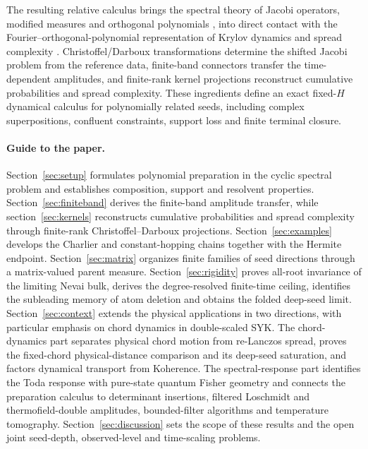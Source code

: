 \documentclass[a4paper,11pt]{article}
\theoremstyle{definition}
\theoremstyle{remark}
\begin{document}
The resulting relative calculus brings the spectral theory of Jacobi operators,
modified measures and orthogonal polynomials
\cite{Chihara1978,Szego1975,SimonOPRL1,Uvarov1969,KautskyGolub1983},
into direct contact with the Fourier--orthogonal-polynomial representation of
Krylov dynamics and spread complexity
\cite{Balasubramanian:2022tpr,MuckYang:2022,Nandy2024,Qu2025LanczosOP}.
Christoffel/Darboux transformations determine
the shifted Jacobi problem from the reference data, finite-band
connectors transfer the time-dependent amplitudes, and finite-rank
kernel projections reconstruct cumulative probabilities and spread
complexity. These ingredients define an exact fixed-$H$ dynamical
calculus for polynomially related seeds, including complex
superpositions, confluent constraints, support loss and finite
terminal closure.

\paragraph{Guide to the paper.}
Section~\ref{sec:setup} formulates polynomial preparation in
the cyclic spectral problem and establishes composition, support and resolvent properties.
Section~\ref{sec:finiteband} derives the finite-band amplitude transfer, while
section~\ref{sec:kernels} reconstructs cumulative probabilities and spread complexity through
finite-rank Christoffel--Darboux projections.  Section~\ref{sec:examples} develops the Charlier
and constant-hopping chains together with the Hermite endpoint.  Section~\ref{sec:matrix}
organizes finite families of seed directions through a matrix-valued parent measure.
Section~\ref{sec:rigidity} proves all-root invariance of the limiting Nevai bulk, derives the
degree-resolved finite-time ceiling, identifies the subleading memory of atom deletion and obtains
the folded deep-seed limit.  
Section~\ref{sec:context} extends the physical applications in two directions, with particular emphasis on chord dynamics in double-scaled SYK.  The
chord-dynamics part separates physical chord motion from re-Lanczos spread,
proves the fixed-chord physical-distance comparison and its deep-seed saturation, and factors dynamical
transport from Koherence.  The spectral-response part identifies the Toda response with
pure-state quantum Fisher geometry and connects the preparation calculus to determinant
insertions, filtered Loschmidt and thermofield-double amplitudes, bounded-filter algorithms and
temperature tomography.  Section~\ref{sec:discussion} sets the scope of these results and the
open joint seed-depth, observed-level and time-scaling problems.
\end{document}
